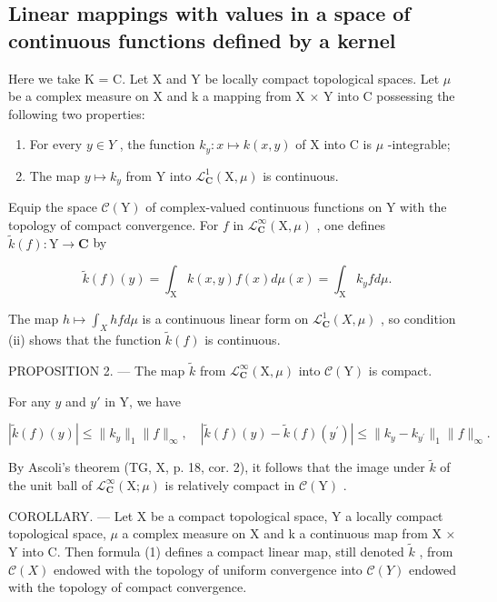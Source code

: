 \subsection{Linear mappings with values in a space of continuous functions defined by a kernel}

Here we take K = C. Let X and Y be locally compact topological spaces. Let \(\mu\) be a complex measure on X and k a mapping from X × Y into C possessing the following two properties:

\begin{enumerate}
\def\labelenumi{(\roman{enumi})}
\item
  For every \(y \in Y\) , the function \(k_{y} \colon x \mapsto k(x, y)\) of X into C is \(\mu\) -integrable;
\item
  The map \(y \mapsto k_{y}\) from Y into \(\mathcal{L}_{\mathbf{C}}^{1}(\mathrm{X}, \mu)\) is continuous.
\end{enumerate}

Equip the space \(\mathcal{C}(\mathrm{Y})\) of complex-valued continuous functions on Y with the topology of compact convergence. For \(f\) in \(\mathcal{L}_{\mathbf{C}}^{\infty}(\mathrm{X},\mu)\) , one defines \(\widetilde{k}(f)\colon \mathrm{Y}\to \mathbf{C}\) by

\[
\widetilde {k} (f) (y) = \int_ {\mathrm{X}} k (x, y) f (x) d \mu (x) = \int_ {\mathrm{X}} k _ {y} f d \mu .\tag{1}
\]

The map \(h \mapsto \int_{X} hfd\mu\) is a continuous linear form on \(\mathcal{L}_{\mathbf{C}}^{1}(X,\mu)\) , so condition (ii) shows that the function \(\widetilde{k}(f)\) is continuous.

PROPOSITION 2. — The map \(\widetilde{k}\) from \(\mathcal{L}_{\mathbf{C}}^{\infty}(\mathrm{X},\mu)\) into \(\mathcal{C}(\mathrm{Y})\) is compact.

For any \(y\) and \(y'\) in Y, we have

\[
| \widetilde {k} (f) (y) | \leqslant \| k _ {y} \| _ {1} \| f \| _ {\infty}, \quad | \widetilde {k} (f) (y) - \widetilde {k} (f) (y ^ {\prime}) | \leqslant \| k _ {y} - k _ {y ^ {\prime}} \| _ {1} \| f \| _ {\infty}.
\]

By Ascoli's theorem (TG, X, p. 18, cor. 2), it follows that the image under \(\widetilde{k}\) of the unit ball of \(\mathcal{L}_{\mathbf{C}}^{\infty}(\mathrm{X};\mu)\) is relatively compact in \(\mathcal{C}(\mathrm{Y})\) .

COROLLARY. --- Let X be a compact topological space, Y a locally compact topological space, \(\mu\) a complex measure on X and k a continuous map from X × Y into C. Then formula (1) defines a compact linear map, still denoted \(\widetilde{k}\) , from \(\mathcal{C}(X)\) endowed with the topology of uniform convergence into \(\mathcal{C}(Y)\) endowed with the topology of compact convergence.

